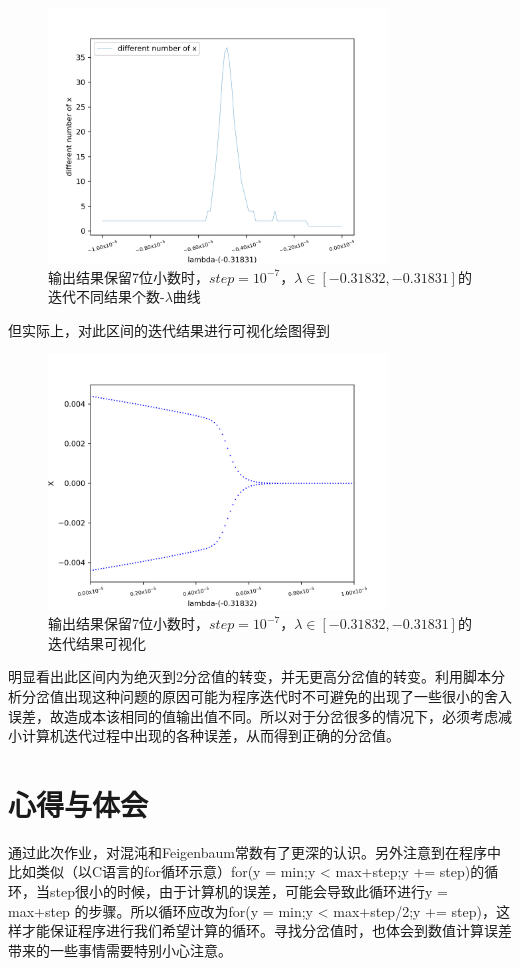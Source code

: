 \documentclass[a4paper,11pt]{article}
\begin{document}
\begin{figure}[!htbp]        
\centering
\includegraphics[bb= 0 0 450 370,width=9cm]{7-7.png}      
\caption{输出结果保留7位小数时，$step = 10^{-7}$，$\lambda \in [-0.31832,-0.31831]$的迭代不同结果个数-$\lambda$曲线}      
\end{figure}

\newpage
但实际上，对此区间的迭代结果进行可视化绘图得到

\begin{figure}[!htbp]        
\centering
\includegraphics[bb= 0 0 450 370,width=9cm]{7-7-1.png}      
\caption{输出结果保留7位小数时，$step = 10^{-7}$，$\lambda \in [-0.31832,-0.31831]$的迭代结果可视化}      
\end{figure}


明显看出此区间内为绝灭到2分岔值的转变，并无更高分岔值的转变。利用脚本分析分岔值出现这种问题的原因可能为程序迭代时不可避免的出现了一些很小的舍入误差，故造成本该相同的值输出值不同。所以对于分岔很多的情况下，必须考虑减小计算机迭代过程中出现的各种误差，从而得到正确的分岔值。

\section{心得与体会}
通过此次作业，对混沌和Feigenbaum常数有了更深的认识。另外注意到在程序中比如类似（以C语言的for循环示意）for(y = min;y < max+step;y += step)的循环，当step很小的时候，由于计算机的误差，可能会导致此循环进行y = max+step 的步骤。所以循环应改为for(y = min;y < max+step/2;y += step)，这样才能保证程序进行我们希望计算的循环。寻找分岔值时，也体会到数值计算误差带来的一些事情需要特别小心注意。 
\end{document}
